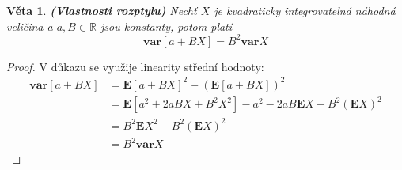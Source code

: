 \documentclass[a4]{report}
\newtheorem{theorem}{Věta}
\theoremstyle{definition}
\begin{document}
{\begin{theorem}{\textbf{(Vlastnosti rozptylu)}}
Nechť $X$ je kvadraticky integrovatelná náhodná veličina a $a, B \in \mathbb{R}$ jsou konstanty, potom platí
\begin{equation}
\mathbf{var}[a + BX] = B^{2}\mathbf{var}X
\end{equation}
\end{theorem}
\begin{proof}
V důkazu se využije linearity střední hodnoty:
\begin{align*}
\mathbf{var}[a + BX] &= \mathbf{E}[a + BX]^{2} - (\mathbf{E}[a + BX])^{2} \\
&= \mathbf{E}[a^{2} + 2aBX + B^{2}X^{2}] - a^{2} - 2aB\mathbf{E}X - B^{2}(\mathbf{E}X)^{2} \\
&= B^{2}\mathbf{E}X^{2} - B^{2}(\mathbf{E}X)^{2} \\
&= B^{2}\mathbf{var}X
\end{align*}
\end{proof}

}
\end{document}
